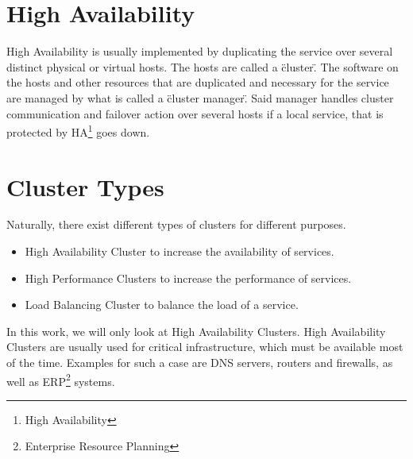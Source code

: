 \section{High Availability}


High Availability is usually implemented by duplicating the service over several distinct physical or
virtual hosts. The hosts are called a \"cluster\". The software on the hosts and other resources
that are duplicated and necessary for the service are managed by what is called a \"cluster manager\".
Said manager handles cluster communication and failover action over several hosts if a local service,
that is protected by HA\footnote{High Availability} goes down.

\section{Cluster Types}

Naturally, there exist different types of clusters for different purposes.
\begin{itemize}
\item High Availability Cluster to increase the availability of services.
\item High Performance Clusters to increase the performance of services.
\item Load Balancing Cluster to balance the load of a service.
\end{itemize}

In this work, we will only look at High Availability Clusters.
High Availability Clusters are usually used for critical infrastructure,
which must be available most of the time. Examples for such a case are DNS servers,
routers and firewalls, as well as ERP\footnote{Enterprise Resource Planning} systems.
